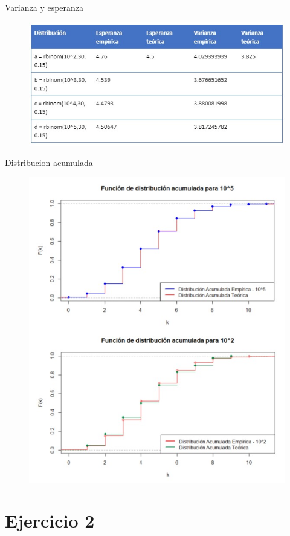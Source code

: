 \documentclass{beamer}
\begin{document}
\begin{frame}{Varianza y esperanza}
\begin{figure}[htpb]
        \begin{center}
            \includegraphics[width=0.8\linewidth]{pic/ej1_tabla.jpeg}
        \end{center}
    \end{figure}
    
\end{frame}

\begin{frame}{Distribucion acumulada}
\begin{figure}[htpb]
        \begin{center}
            \includegraphics[width=0.6\linewidth]{pic/ej1_esca.jpeg}
        \end{center}
    \end{figure}
    
\end{frame}



\section{Ejercicio 2}
\end{document}
